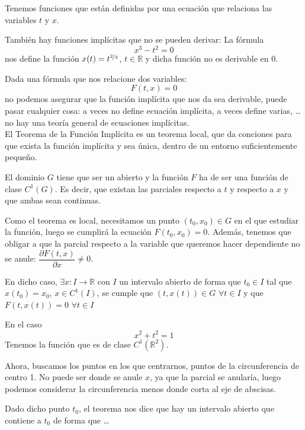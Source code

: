 Tenemos funciones que están definidas por una ecuación que relaciona las variables $t$ y $x$.

También hay funciones implícitas que no se pueden derivar:
La fórmula
\begin{equation*}
    x^3-t^2 = 0
\end{equation*}
nos define la función $x(t) = t^{\nicefrac{2}{3}}$, $t\in \mathbb{R}$ y dicha función no es derivable en 0.

Dada una fórmula que nos relacione dos variables:
\begin{equation*}
    F(t,x) = 0
\end{equation*}
no podemos asegurar que la función implícita que nos da sea derivable, puede pasar cualquier cosa: a veces no define ecuación implícita, a veces define varias, \ldots no hay una teoría general de ecuaciones implícitas.\\

El Teorema de la Función Implícita es un teorema local, que da conciones para que exista la función implícita y sea única, dentro de un entorno suficientemente pequeño.

El dominio $G$ tiene que ser un abierto y la función $F$ ha de ser una función de clase $C^1(G)$. Es decir, que existan las parciales respecto a $t$ y respecto a $x$ y que ambas sean continuas. 

Como el teorema es local, necesitamos un punto $(t_0,x_0)\in G$ en el que estudiar la función, luego se cumplirá la ecuación $F(t_0,x_0)=0$. Además, tenemos que obligar a que la parcial respecto a la variable que queremos hacer dependiente no se anule: $\dfrac{\partial F(t,x)}{\partial x} \neq 0$.

En dicho caso, $\exists x:I\rightarrow\mathbb{R}$ con $I$ un intervalo abierto de forma que $t_0\in I$ tal que $x(t_0) = x_0$, $x\in C^1(I)$, se cumple que $(t,x(t)) \in G$ $\forall t\in I$ y que $F(t,x(t)) = 0$ $\forall t\in I$


\begin{ejemplo}
    En el caso
    \begin{equation*}
        x^2+t^2 = 1
    \end{equation*}
    Tenemos la función 
    que es de clase $C^1(\mathbb{R}^2)$.
    
    Ahora, buscamos los puntos en los que centrarnos, puntos de la circunferencia de centro 1.
    No puede ser donde se anule $x$, ya que la parcial se anularía, luego podemos considerar la circunferencia menos donde corta al eje de abscisas.


    Dado dicho punto $t_0$, el teorema nos dice que hay un intervalo abierto que contiene a $t_0$ de forma que \ldots
\end{ejemplo}

